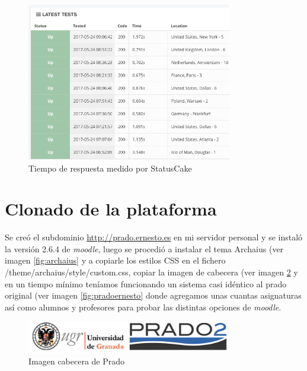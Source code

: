 \begin{figure}[H]
\centering
\includegraphics[width=0.8\textwidth]{../screenshots/statuscake2}
\caption{Tiempo de respuesta medido por StatusCake}
\label{fig:statuscake2}
\end{figure}


\section{Clonado de la plataforma}

Se creó el subdominio \url{http://prado.ernesto.es} en mi servidor personal y se instaló la versión 2.6.4 de \textit{moodle}, luego se procedió a instalar el tema Archaius  (ver imagen \ref{fig:archaius} y a copiarle los estilos CSS en el fichero /theme/archaius/style/custom.css, copiar la imagen de cabecera (ver imagen \ref{fig:cabeceraprado} y en un tiempo mínimo teníamos funcionando un sistema casi idéntico al prado original (ver imagen \ref{fig:pradoernesto} donde agregamos unas cuantas asignaturas así como alumnos y profesores para probar las distintas opciones de \textit{moodle}.

\begin{figure}[H]
\centering
\includegraphics[width=0.8\textwidth]{../screenshots/cabeceraprado}
\caption{Imagen cabecera de Prado}
\label{fig:cabeceraprado}
\end{figure}


